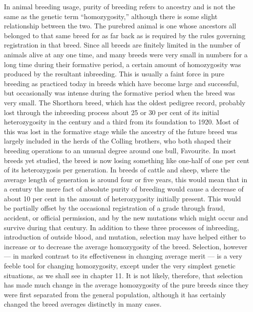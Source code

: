 In animal breeding usage, purity of breeding refers to ancestry and
is not the same as the genetic term ``homozygosity,'' although there is
some slight relationship between the two. The purebred animal is one
whose ancestors all belonged to that same breed for as far back as is
required by the rules governing registration in that breed. Since all
breeds are finitely limited in the number of animals alive at any one
time, and many breeds were very small in numbers for a long time during
their formative period, a certain amount of homozygosity was produced
by the resultant inbreeding. This is usually a faint force in
pure breeding as practiced today in breeds which have become large and
successful, but occasionally was intense during the formative period
when the breed was very small. The Shorthorn breed, which has the
oldest pedigree record, probably lost through the inbreeding process
about 25 or 30 per cent of its initial heterozygosity in the century and a
third from its foundation to 1920. Most of this was lost in the formative
stage while the ancestry of the future breed was largely included in the
herds of the Colling brothers, who both shaped their breeding operations
to an unusual degree around one bull, Favourite. In most breeds
yet studied, the breed is now losing something like one-half of one per
cent of its heterozygosis per generation. In breeds of cattle and sheep,
where the average length of generation is around four or five years, this
would mean that in a century the mere fact of absolute purity of breeding
would cause a decrease of about 10 per cent in the amount of heterozygosity
initially present. This would be partially offset by the
occasional registration of a grade through fraud, accident, or official
permission, and by the new mutations which might occur and survive
during that century. In addition to these three processes of inbreeding,
introduction of outside blood, and mutation, selection may have helped
either to increase or to decrease the average homozygosity of the breed.
Selection, however --- in marked contrast to its effectiveness in changing
average merit --- is a very feeble tool for changing homozygosity, except
under the very simplest genetic situations, as we shall see in chapter 11.
It is not likely, therefore, that selection has made much change in the
average homozygosity of the pure breeds since they were first separated
from the general population, although it has certainly changed the
breed averages distinctly in many cases.

